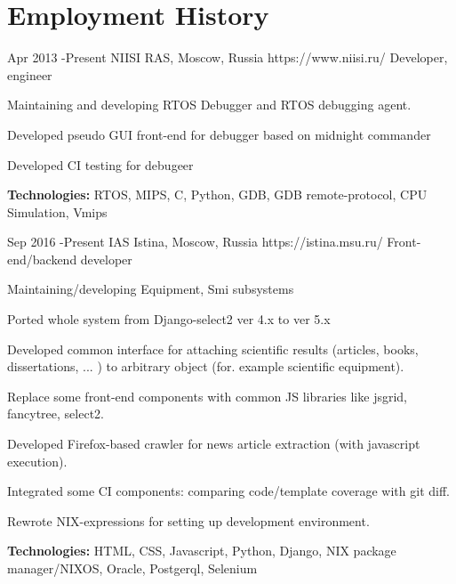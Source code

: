 \documentclass[10pt]{article} %
\begin{document}



\section{Employment History}
\job
{Apr 2013 -}{Present}
{NIISI RAS, Moscow, Russia}
{https://www.niisi.ru/}
{Developer, engineer}
{

\begin{itemize-noindent}
\item{Maintaining and developing RTOS Debugger and RTOS debugging agent.}
\item{Developed pseudo GUI front-end for debugger based on midnight commander}
\item{Developed CI testing for debugeer}
\end{itemize-noindent}

\rule{0mm}{5mm}\textbf{Technologies:} RTOS, MIPS, C, Python, GDB, GDB remote-protocol, CPU Simulation, Vmips}


\job
{Sep 2016 -}{Present}
{IAS Istina, Moscow, Russia}
{https://istina.msu.ru/}
{Front-end/backend developer}
{
\begin{itemize-noindent}
\item{Maintaining/developing Equipment, Smi subsystems}
\item{Ported whole system from Django-select2 ver 4.x to ver 5.x}
\item{Developed common interface for attaching scientific results (articles, books, dissertations, ... ) to arbitrary object (for. example scientific equipment).}
\item{Replace some front-end components with common JS libraries like jsgrid, fancytree, select2.}
\item{Developed Firefox-based crawler for news article extraction (with javascript execution).}
\item{Integrated some CI components: comparing code/template coverage with git diff.}
\item{Rewrote NIX-expressions for setting up development environment.}
\end{itemize-noindent}


\rule{0mm}{5mm}\textbf{Technologies:} HTML, CSS, Javascript, Python, Django, NIX package manager/NIXOS, Oracle, Postgerql, Selenium}
\end{document}
